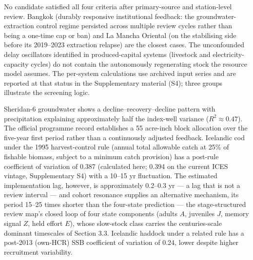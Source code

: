 \documentclass[11pt]{article}
\begin{document}
No candidate satisfied all four criteria after primary-source and
station-level review. Bangkok (durably responsive institutional feedback: the groundwater-extraction control regime persisted across multiple review cycles rather than being a one-time cap or ban) and La Mancha Oriental (on the
stabilising side before its 2019--2023 extraction relapse) are the
closest cases. The unconfounded delay oscillators identified in
produced-capital systems (livestock and electricity-capacity cycles) do
not contain the autonomously regenerating stock the resource model
assumes. The per-system calculations use archived input series and are reported at that status in the
Supplementary material (S4); three groups illustrate the screening logic.

Sheridan-6 groundwater shows a decline--recovery--decline pattern with
precipitation explaining approximately half the index-well variance
(\(R^2\approx0.47\)). The official programme record establishes a 55
acre-inch block allocation over the five-year first period rather than a
continuously adjusted feedback. Icelandic cod under the 1995
harvest-control rule (annual total allowable catch at 25\% of fishable
biomass, subject to a minimum catch provision) has a post-rule coefficient of variation of 0.387 (calculated here; 0.394 on the current ICES vintage, Supplementary S4) with a 10--15 yr fluctuation. The estimated implementation lag, however, is approximately
0.2--0.3 yr --- a lag that is not a review interval --- and cohort
resonance supplies an alternative mechanism, its period 15--25 times
shorter than the four-state prediction --- the stage-structured review
map's closed loop of four state components (adults \(A\), juveniles
\(J\), memory signal \(Z\), held effort \(E\)), whose slow-stock class
carries the centuries-scale dominant timescales of Section 3.3.
Icelandic haddock under a related rule has a post-2013 (own-HCR) SSB coefficient of variation of 0.24, lower despite higher recruitment variability.
\end{document}
